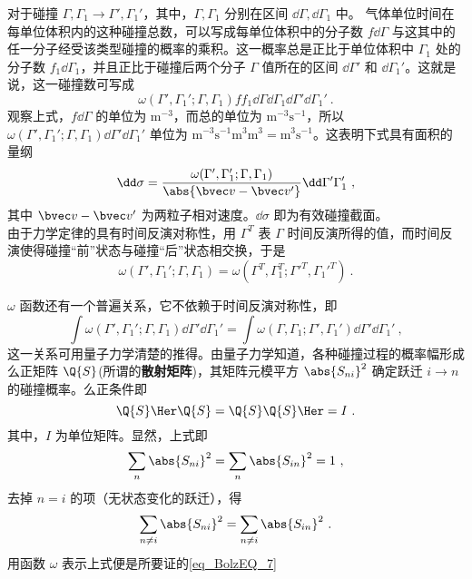  对于碰撞 $\Gamma,\Gamma_1\rightarrow\Gamma',\Gamma_1'$，其中，$\Gamma,\Gamma_1$ 分别在区间 $\dd\Gamma,\dd\Gamma_1$ 中。 气体单位时间在每单位体积内的这种碰撞总数，可以写成每单位体积中的分子数 $f\dd\Gamma$ 与这其中的任一分子经受该类型碰撞的概率的乘积。这一概率总是正比于单位体积中 $\Gamma_1$ 处的分子数 $f_1\dd \Gamma_1$，并且正比于碰撞后两个分子 $\Gamma$ 值所在的区间 $\dd\Gamma'$ 和 $\dd \Gamma_1'$。这就是说，这一碰撞数可写成
 \begin{equation}\label{eq_BolzEQ_5}
\omega(\Gamma',\Gamma_1';\Gamma,\Gamma_1)ff_1\dd\Gamma\dd\Gamma_1\dd\Gamma'\dd\Gamma_1'~.
 \end{equation}
 观察上式，$f\dd \Gamma$ 的单位为 $\mathrm{m^{-3}}$，而总的单位为 $\mathrm{m^{-3}s^{-1}}$，所以 $\omega(\Gamma',\Gamma_1';\Gamma,\Gamma_1)\dd\Gamma'\dd\Gamma_1'$ 单位为 $\mathrm{m^{-3}s^{-1}m^{3}m^{3}=m^3s^{-1}}$。这表明下式具有面积的量纲
 \begin{equation}\label{eq_BolzEQ_2}
 \dd \sigma=\frac{\omega(\Gamma',\Gamma_1';\Gamma,\Gamma_1)}{\abs{\bvec v-\bvec v'}}\dd\Gamma'\Gamma_1'~,
 \end{equation}
 其中 $\bvec v-\bvec v'$ 为两粒子相对速度。$\dd\sigma$ 即为有效碰撞截面。\\

由于力学定律的具有时间反演对称性，用 $\Gamma^T$ 表 $\Gamma$ 时间反演所得的值，而时间反演使得碰撞“前”状态与碰撞“后”状态相交换，于是
 \begin{equation}
 \omega(\Gamma',\Gamma_1';\Gamma,\Gamma_1)=\omega(\Gamma^T,\Gamma_1^T;\Gamma'^T,\Gamma_1'^T)~.
 \end{equation}

 
$\omega$ 函数还有一个普遍关系，它不依赖于时间反演对称性，即
\begin{equation}\label{eq_BolzEQ_7}
\int\omega(\Gamma',\Gamma_1';\Gamma,\Gamma_1)\dd\Gamma'\dd\Gamma_1'=\int\omega(\Gamma,\Gamma_1;\Gamma',\Gamma_1')\dd\Gamma'\dd\Gamma_1'~,
\end{equation}
这一关系可用量子力学清楚的推得。由量子力学知道，各种碰撞过程的概率幅形成么正矩阵 $\Q{S}$(所谓的\textbf{散射矩阵})，其矩阵元模平方 $\abs{S_{ni}}^2$ 确定跃迁 $i\rightarrow n$ 的碰撞概率。么正条件即
\begin{equation}
\Q{S}\Her\Q{S}=\Q{S}\Q{S}\Her=I~.
\end{equation}
其中，$I$ 为单位矩阵。显然，上式即
\begin{equation}
\sum_n \abs{S_{ni}}^2=\sum_n \abs{S_{in}}^2=1~,
\end{equation}
去掉 $n=i$ 的项（无状态变化的跃迁），得
\begin{equation}
\sum_{n\neq i} \abs{S_{ni}}^2=\sum_{n\neq i} \abs{S_{in}}^2~.
\end{equation}
用函数 $\omega$ 表示上式便是所要证的\autoref{eq_BolzEQ_7} 
